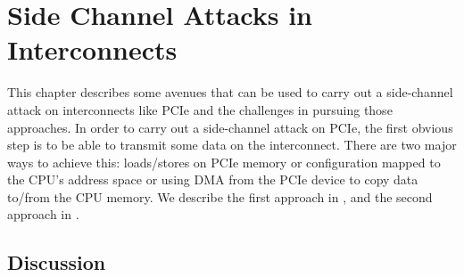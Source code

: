 \chapter{Side Channel Attacks in Interconnects}

This chapter describes some avenues that can be used to carry out a side-channel attack on interconnects like PCIe and the challenges in pursuing those approaches.
In order to carry out a side-channel attack on PCIe, the first obvious step is to be able to transmit some data on the interconnect.
There are two major ways to achieve this: loads/stores on PCIe memory or configuration mapped to the CPU's address space or using DMA from the PCIe device to copy data to/from the CPU memory.
We describe the first approach in , and the second approach in .




\section{Discussion}\label{sec:interconnect-sc-discussion}

\endinput

Should we consider the pre-microcode-update results and talk about that? It is NOT a vulnerability, just a behavioural observation. Hence, I don't think we need responsible disclosure